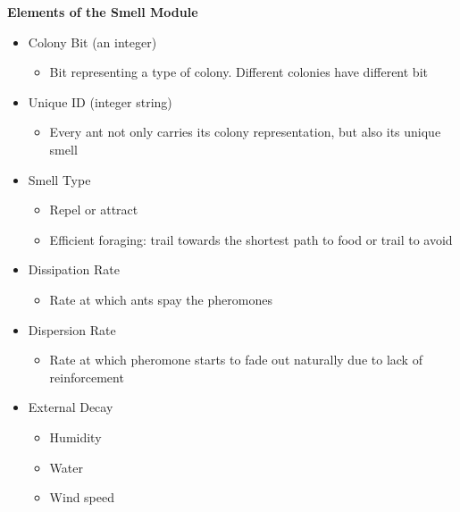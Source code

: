 \documentclass[titlepage, 12pt]{article}
\begin{document}
{\bf Elements of the Smell Module}
\begin{itemize}
		\item Colony Bit (an integer)
			\begin{itemize}
			\item Bit representing a type of colony. Different colonies have different bit 
			\end{itemize}
		\item Unique ID (integer string)
			\begin{itemize}
			\item Every ant not only carries its colony representation, but also its unique smell
			\end{itemize}
		\item Smell Type
			\begin{itemize}
			\item Repel or attract
			\item Efficient foraging: trail towards the shortest path to food or trail to avoid 
			\end{itemize}
		\item Dissipation Rate
			\begin{itemize}
			\item Rate at which ants spay the pheromones
			\end{itemize}
		\item Dispersion Rate
			\begin{itemize}
			\item Rate at which pheromone starts to fade out naturally due to lack of reinforcement
			\end{itemize}
		\item External Decay
			\begin{itemize}
			\item Humidity
			\item Water
			\item Wind speed
			\end{itemize}
\end{itemize}


\end{document}
